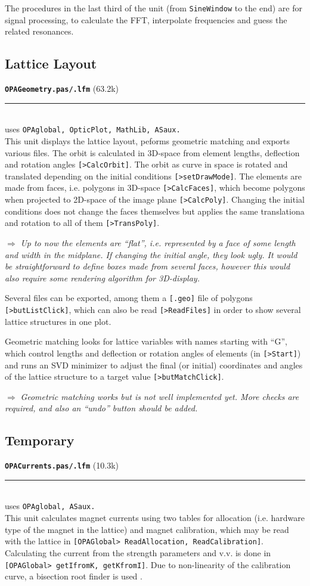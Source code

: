 \documentclass[12pt]{article}
\newcommand\todo[1]{$\Longrightarrow$ {\em #1} }
\newcommand\code[1]{{\tt [#1]}}
\newcommand\opamodule[3]{{\bf \tt #1} #2\\  \rule[3pt]{\textwidth}{0.2pt} \\ {\scriptsize uses \tt  #3}\\[1ex]}
\begin{document}
The procedures in the last third of the unit (from {\tt SineWindow} to the end) are for signal processing, to calculate the FFT, interpolate frequencies and guess the related resonances.\\

\subsection{Lattice Layout}
\opamodule{OPAGeometry.pas/.lfm}{(63.2k)}{OPAglobal, OpticPlot, MathLib, ASaux.}
This unit displays the lattice layout, peforms geometric matching and exports various files.
The orbit is calculated in 3D-space from element lengths, deflection and rotation angles \code{>CalcOrbit}. The orbit as curve in space is rotated and translated depending on the initial conditions \code{>setDrawMode}.
The elements are made from faces, i.e. polygons in 3D-space \code{>CalcFaces}, which become polygons when projected to 2D-space of the image plane \code{>CalcPoly}. Changing the initial conditions does not change the faces themselves but applies the same translationa and rotation to all of them \code{>TransPoly}.

\todo{Up to now the elements are ``flat'', i.e. represented by a face of some length and width in the midplane. If changing the initial angle, they look ugly. It would be straightforward to define boxes made from several faces, however this would also require some rendering algorithm for 3D-display.}

Several files can be exported, among them a \code{.geo} file of polygons \code{>butListClick}, which can also be read \code{>ReadFiles} in order to show several lattice structures in one plot.

Geometric matching looks for lattice variables with names starting with ``G'', which control lengths and deflection or rotation angles of elements (in \code{>Start}) and runs an SVD minimizer to adjust the final (or initial) coordinates and angles of the lattice structure to a target value \code{>butMatchClick}.

\todo{Geometric matching works but is not well implemented yet. More checks are required, and also an ``undo'' button should be added.}


\subsection{Temporary}
\opamodule{OPACurrents.pas/.lfm}{(10.3k)}{OPAglobal, ASaux.}
This unit calculates magnet currents using two tables for allocation (i.e. hardware type of the magnet in the lattice) and magnet calibration, which may be read with the lattice in \code{OPAGlobal> ReadAllocation, ReadCalibration}. Calculating the current from the strength parameters and v.v. is done in \code{OPAGlobal> getIfromK, getKfromI}. Due to non-linearity of the calibration curve, a bisection root finder is used \cite{numrec}.
\end{document}
